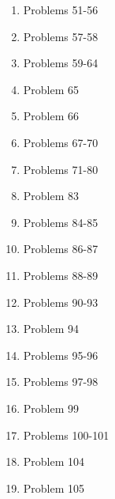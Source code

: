 \documentclass[11pt]{article}
\begin{document}
\begin{multicols}{2}
\begin{enumerate}
\begin{enumerate}[-]
			\item Problems 51-56
			\item Problems 57-58
			\item Problems 59-64
			\item Problem 65
			\item Problem 66
			\item Problems 67-70
			\item Problems 71-80
			\item Problem 83
			\item Problems 84-85
			\item Problems 86-87
			\item Problems 88-89
			\item Problems 90-93
			\item Problem 94
			\item Problems 95-96
			\item Problems 97-98
			\item Problem 99
			\item Problems 100-101
			\item Problem 104
			\item Problem 105
		\end{enumerate}
	\end{enumerate}
	
	\end{multicols}
	
\end{document}
